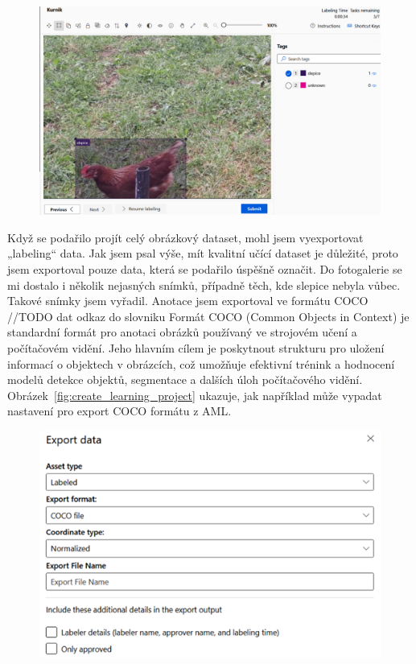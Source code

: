 \begin{figure}[htbp]
    \centering
    \includegraphics[width=1.0\textwidth]{img/chicken_labeling}
    \label{fig:chicken_labeling}
\end{figure}

Když se podařilo projít celý obrázkový dataset, mohl jsem vyexportovat „labeling“ data.
Jak jsem psal výše, mít kvalitní učící dataset je důležité, proto jsem exportoval pouze data, která se podařilo úspěšně označit.
Do fotogalerie se mi dostalo i několik nejasných snímků, případně těch, kde slepice nebyla vůbec.
Takové snímky jsem vyřadil.
Anotace jsem exportoval ve formátu COCO~\cite{COCOFormat}  //TODO dat odkaz do slovniku
Formát COCO (Common Objects in Context) je standardní formát pro anotaci obrázků používaný ve strojovém učení a počítačovém vidění.
Jeho hlavním cílem je poskytnout strukturu pro uložení informací o objektech v obrázcích, což umožňuje efektivní trénink a hodnocení modelů detekce objektů, segmentace a dalších úloh počítačového vidění.
Obrázek~\ref{fig:create_learning_project} ukazuje, jak například může vypadat nastavení pro export COCO formátu z AML.

\begin{figure}[htbp]
    \centering
    \includegraphics[width=1.0\textwidth]{img/export_coco_format}
    \label{fig:export_coco_format}
\end{figure}

